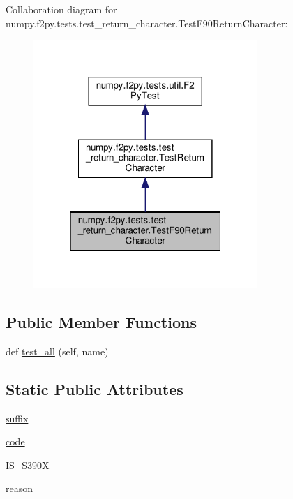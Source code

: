 Collaboration diagram for numpy.\+f2py.\+tests.\+test\+\_\+return\+\_\+character.\+Test\+F90\+Return\+Character\+:
\nopagebreak
\begin{figure}[H]
\begin{center}
\leavevmode
\includegraphics[width=241pt]{classnumpy_1_1f2py_1_1tests_1_1test__return__character_1_1TestF90ReturnCharacter__coll__graph}
\end{center}
\end{figure}
\subsection*{Public Member Functions}
\begin{DoxyCompactItemize}
\item 
def \hyperlink{classnumpy_1_1f2py_1_1tests_1_1test__return__character_1_1TestF90ReturnCharacter_a8da779e136163581fdfbd737d90b6b01}{test\+\_\+all} (self, name)
\end{DoxyCompactItemize}
\subsection*{Static Public Attributes}
\begin{DoxyCompactItemize}
\item 
\hyperlink{classnumpy_1_1f2py_1_1tests_1_1test__return__character_1_1TestF90ReturnCharacter_afea9eae7a9301f24bf8ae9ed98632716}{suffix}
\item 
\hyperlink{classnumpy_1_1f2py_1_1tests_1_1test__return__character_1_1TestF90ReturnCharacter_a348c43c6c9b60b30f5de58e892138ac4}{code}
\item 
\hyperlink{classnumpy_1_1f2py_1_1tests_1_1test__return__character_1_1TestF90ReturnCharacter_a616e5a36495bd01190e1eaa8021431dc}{I\+S\+\_\+\+S390X}
\item 
\hyperlink{classnumpy_1_1f2py_1_1tests_1_1test__return__character_1_1TestF90ReturnCharacter_a59e77cc166602ea133ad33dd90a6e2fe}{reason}
\end{DoxyCompactItemize}


